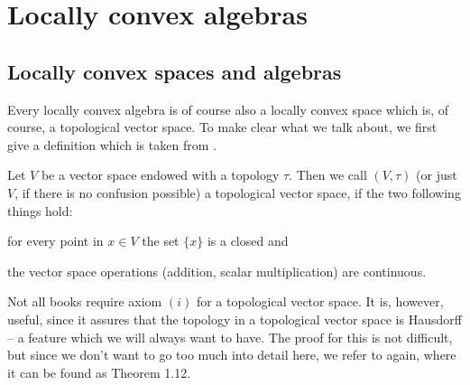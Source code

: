 \section{Locally convex algebras}
\label{sec:chap5_LCAlg}

\subsection{Locally convex spaces and algebras}

Every locally convex algebra is of course also a locally convex space which 
is, of course, a topological vector space. To make clear what we talk about, 
we first give a definition which is taken from \cite{Rudin:Blue}.
\begin{definition}
	\label{Def:TVSpace}
	Let $V$ be a vector space endowed with a topology $\tau$. Then we call 
	$(V, \tau)$ (or just $V$, if there is no confusion possible) 
	a topological vector space, if the two following things  hold:
	\begin{definitionlist}
		\item
		for every point in $x \in V$ the set $\{x\} $ is a closed and
		
		\item
		the vector space operations (addition, scalar multiplication) are 
		continuous.
	\end{definitionlist}
\end{definition}
Not all books require axiom $(i)$ for a topological vector space. It is, 
however, useful, since it assures that the topology in a topological vector 
space is Hausdorff -- a feature which we will always want to have. The proof 
for this is not difficult, but since we don't want to go too much into detail 
here, we refer to \cite{Rudin:Blue} again, where it can be found as Theorem 
1.12.


